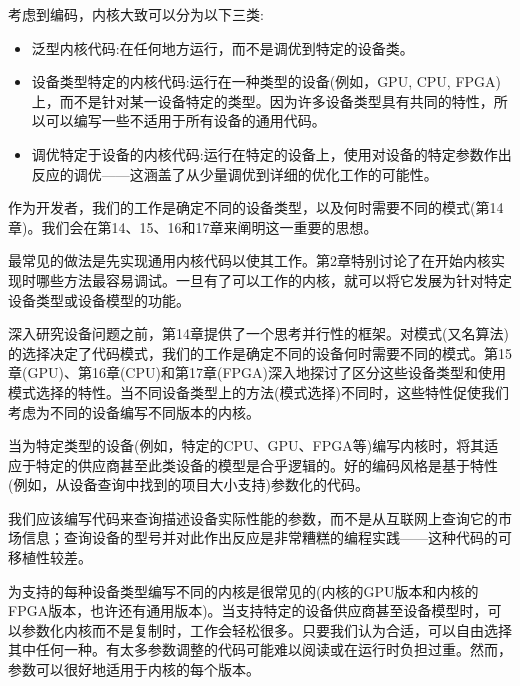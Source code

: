 考虑到编码，内核大致可以分为以下三类:\par

\begin{itemize}
	\item 泛型内核代码:在任何地方运行，而不是调优到特定的设备类。
	\item 设备类型特定的内核代码:运行在一种类型的设备(例如，GPU, CPU, FPGA)上，而不是针对某一设备特定的类型。因为许多设备类型具有共同的特性，所以可以编写一些不适用于所有设备的通用代码。
	\item 调优特定于设备的内核代码:运行在特定的设备上，使用对设备的特定参数作出反应的调优——这涵盖了从少量调优到详细的优化工作的可能性。
\end{itemize}

\begin{tcolorbox}[colback=red!5!white,colframe=red!75!black]
作为开发者，我们的工作是确定不同的设备类型，以及何时需要不同的模式(第14章)。我们会在第14、15、16和17章来阐明这一重要的思想。
\end{tcolorbox}

最常见的做法是先实现通用内核代码以使其工作。第2章特别讨论了在开始内核实现时哪些方法最容易调试。一旦有了可以工作的内核，就可以将它发展为针对特定设备类型或设备模型的功能。\par

深入研究设备问题之前，第14章提供了一个思考并行性的框架。对模式(又名算法)的选择决定了代码模式，我们的工作是确定不同的设备何时需要不同的模式。第15章(GPU)、第16章(CPU)和第17章(FPGA)深入地探讨了区分这些设备类型和使用模式选择的特性。当不同设备类型上的方法(模式选择)不同时，这些特性促使我们考虑为不同的设备编写不同版本的内核。\par

当为特定类型的设备(例如，特定的CPU、GPU、FPGA等)编写内核时，将其适应于特定的供应商甚至此类设备的模型是合乎逻辑的。好的编码风格是基于特性(例如，从设备查询中找到的项目大小支持)参数化的代码。\par

我们应该编写代码来查询描述设备实际性能的参数，而不是从互联网上查询它的市场信息；查询设备的型号并对此作出反应是非常糟糕的编程实践——这种代码的可移植性较差。\par

为支持的每种设备类型编写不同的内核是很常见的(内核的GPU版本和内核的FPGA版本，也许还有通用版本)。当支持特定的设备供应商甚至设备模型时，可以参数化内核而不是复制时，工作会轻松很多。只要我们认为合适，可以自由选择其中任何一种。有太多参数调整的代码可能难以阅读或在运行时负担过重。然而，参数可以很好地适用于内核的每个版本。\par


